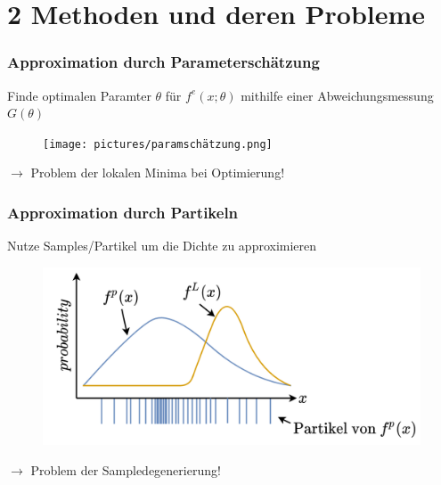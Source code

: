 \documentclass[18pt]{beamer}
\begin{document}
\section{2 Methoden und deren Probleme}
    
\begin{frame}
    \frametitle{Approximation durch Parameterschätzung}
    Finde optimalen Paramter $\theta$ für $f^{e}(x;\theta)$ mithilfe einer Abweichungsmessung $G(\theta)$
    \begin{figure}
        \texttt{[image: pictures/paramschätzung.png]}
    \end{figure}
    \centering
    $\rightarrow$ Problem der lokalen Minima bei Optimierung!
\end{frame}

\begin{frame}
    \frametitle{Approximation durch Partikeln}
    Nutze Samples/Partikel um die Dichte zu approximieren
    \begin{figure}
        \includegraphics[scale=0.25]{pictures/particle_degeneracy.png}
    \end{figure}
    \centering
    $\rightarrow$ Problem der Sampledegenerierung!
\end{frame}
\end{document}
